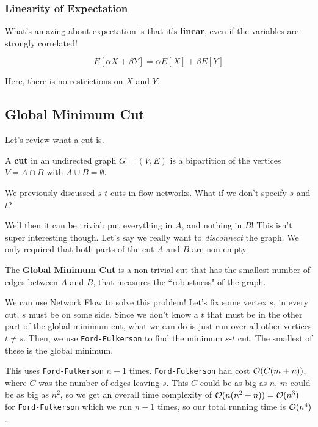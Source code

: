 \documentclass[12pt]{article}
\begin{document}
  \subsubsection{Linearity of Expectation}

  What's amazing about expectation is that it's {\bf linear}, even if the
  variables are strongly correlated!

  \[
    E[\alpha X + \beta Y] = \alpha E[X] + \beta E[Y]
  \]

  Here, there is no restrictions on $X$ and $Y$.

  \subsection{Global Minimum Cut}

  Let's review what a cut is.

  {
    A {\bf cut} in an undirected graph $G = (V, E)$ is a bipartition of the
    vertices $V = A \cap B$ with $A \cup B = \emptyset$.
  }

  We previously discussed $s$-$t$ cuts in flow networks. What if we don't
  specify $s$ and $t$?

  Well then it can be trivial: put everything in $A$, and nothing in $B$! This
  isn't super interesting though. Let's say we really want to {\it disconnect}
  the graph. We only required that both parts of the cut $A$ and $B$ are
  non-empty.

  {
    The {\bf Global Minimum Cut} is a non-trivial cut that has the smallest
    number of edges between $A$ and $B$, that measures the ``robustness" of the
    graph.
  }

  We can use Network Flow to solve this problem! Let's fix some vertex $s$, in
  every cut, $s$ must be on some side. Since we don't know a $t$ that must be
  in the other part of the global minimum cut, what we can do is just run over
  all other vertices $t \ne s$. Then, we use \texttt{Ford-Fulkerson} to find the
  minimum $s$-$t$ cut. The smallest of these is the global minimum.

  This uses \texttt{Ford-Fulkerson} $n - 1$ times. \texttt{Ford-Fulkerson} had
  cost $\mathcal O(C (m + n))$, where $C$ was the number of edges leaving $s$. This $C$
  could be as big as $n$, $m$ could be as big as $n^2$, so we get an overall
  time complexity of $\mathcal O(n(n^2 + n)) = \mathcal O(n^3)$ for \texttt{Ford-Fulkerson}
  which we run $n - 1$ times, so our total running time is $\mathcal O(n^4)$.
\end{document}
